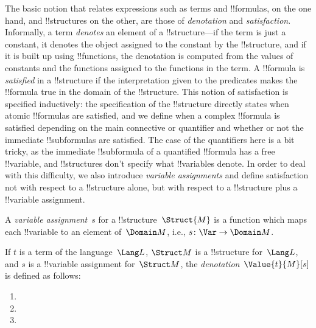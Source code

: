 \documentclass[../../include/open-logic-section]{subfiles}
\begin{document}


\begin{explain}
The basic notion that relates expressions such as terms and
!!{formula}s, on the one hand, and !!{structure}s on the other, are
those of \emph{denotation} and \emph{satisfaction}.  Informally, a
term \emph{denotes} an element of a !!{structure}---if the term is
just a constant, it denotes the object assigned to the constant by the
!!{structure}, and if it is built up using !!{function}s, the
denotation is computed from the values of constants and the functions
assigned to the functions in the term.  A !!{formula} is
\emph{satisfied} in a !!{structure} if the interpretation given to the
predicates makes the !!{formula} true in the domain of the
!!{structure}. This notion of satisfaction is specified inductively:
the specification of the !!{structure} directly states when atomic
!!{formula}s are satisfied, and we define when a complex !!{formula} is
satisfied depending on the main connective or quantifier and whether
or not the immediate !!{subformula}s are satisfied. The case of the
quantifiers here is a bit tricky, as the immediate !!{subformula} of a
quantified !!{formula} has a free !!{variable}, and !!{structure}s
don't specify what !!{variable}s denote.  In order to deal with this
difficulty, we also introduce \emph{variable assignments} and define
satisfaction not with respect to a !!{structure} alone, but with
respect to a !!{structure} plus a !!{variable} assignment.
\end{explain}

\begin{defn}
A \emph{variable assignment}~$s$ for a !!{structure}~$\Struct{M}$ is a
function which maps each !!{variable} to an element of~$\Domain M$,
i.e., $s\colon \Var \to \Domain M$.
\end{defn}

\begin{defn}
If $t$ is a term of the language~$\Lang L$, $\Struct M$ is a
!!{structure} for~$\Lang L$, and $s$ is a !!{variable} assignment
for~$\Struct M$, the \emph{denotation}~$\Value{t}{M}[s]$ is defined as
follows:
\begin{enumerate}
\item {}
\item {}
\item {}
\end{enumerate}
\end{defn}
\end{document}
